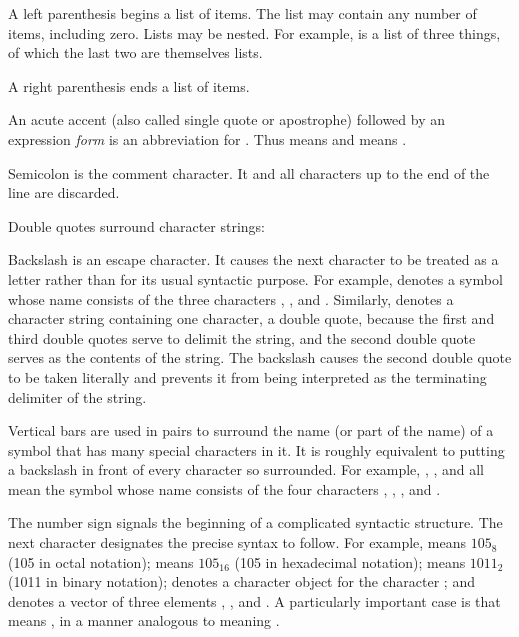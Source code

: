 \begin{indentdesc}{1.2pc}
\item[\cd{(}]
A left parenthesis begins a list of items.  The list may
contain any number of items, including zero.  Lists may be nested.
For example,  is a list of three things,
of which the last two are themselves lists.

\item[\cd{)}] A right parenthesis ends a list of items.

\item[\cd{\Xquote}] An acute accent (also called single
quote or apostrophe) followed by an expression \emph{form}
is an abbreviation for .  Thus  means
 and  means .

\item[\cd{;}] Semicolon is the comment character.  It and all
characters up to the end of the line are discarded.

\item[\cd{"}] Double quotes surround character strings: \\

\item[\cd{{\Xbackslash}}] Backslash is an escape character. 
It causes the next character to be treated as a letter rather than for its usual
syntactic purpose.  For example,  denotes a symbol whose
name consists of the three characters , \cd{(}, and . Similarly,
 denotes a character string containing one character, a
double quote, because the first and third double quotes serve to delimit the
string, and the second double quote serves as the contents of the string.  The
backslash causes the second double quote to be taken literally and prevents it
from being interpreted as the terminating delimiter of the string.

\item[\cd{|}] Vertical bars are used in pairs
to surround the name (or part of the name) of a symbol that has
many special characters in it.  It is roughly equivalent to putting a
backslash in front of every character so surrounded.  For example,
, , and  all mean the symbol whose name
consists of the four characters , \cd{(}, , and \cd{)}.

\item[\cd{\#}] The number sign signals the beginning of a
complicated syntactic structure.
The next character designates the precise syntax to follow.
For example,  means $105_{8}$ (105 in octal notation);
 means $105_{16}$ (105 in hexadecimal notation);
 means $1011_{2}$ (1011 in binary notation);
 denotes a character object for the character ; and
 denotes a vector of three elements , , and .
A particularly important case is that  means ,
in a manner analogous to  meaning .


\end{indentdesc}
